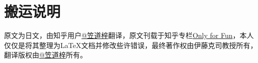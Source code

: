 \section*{搬运说明}

原文为日文，由知乎用户\href{https://www.zhihu.com/people/wo-bei-56}{@笠道梓}翻译，原文刊载于知乎专栏\href{https://www.zhihu.com/column/c_1245739225699885056}{Only for Fun}，本人仅仅是将其整理为\LaTeX 文档并修改些许错误，最终著作权由伊藤克司教授所有，翻译版权由\href{https://www.zhihu.com/people/wo-bei-56}{@笠道梓}所有。

